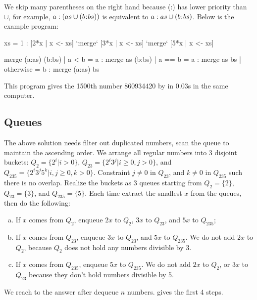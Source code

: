 \documentclass[b5paper]{article}
\begin{document}
We skip many parentheses on the right hand because (:) has lower priority than $\cup$, for example, $a : (as \cup (b \mathbin{\!:\!} bs))$ is equivalent to $a : as \cup (b \mathbin{\!:\!} bs)$. Below is the example program:

\begin{Haskell}
xs = 1 : [2*x | x <- xs] `merge` [3*x | x <- xs] `merge` [5*x | x <- xs]

merge (a:as) (b:bs) | a < b     = a : merge as (b:bs)
                    | a == b    = a : merge as bs
                    | otherwise = b : merge (a:as) bs
\end{Haskell}

This program gives the 1500th number 860934420 by  in 0.03s in the same computer.

\subsection*{Queues}
The above solution needs filter out duplicated numbers, scan the queue to maintain the ascending order. We arrange all regular numbers into 3 disjoint buckets: $Q_2 = \{2^i | i > 0\}$, $Q_{23} = \{ 2^i3^j | i \geq 0, j > 0 \}$, and $Q_{235} = \{ 2^i3^j5^k | i,j \geq 0, k > 0\}$. Constraint $j \neq 0$ in $Q_{23}$, and $k \neq 0$ in $Q_{235}$ such there is no overlap. Realize the buckets as 3 queues starting from $Q_2 = \{ 2 \}$, $Q_{23} = \{ 3\}$, and $Q_{235} = \{ 5 \}$. Each time extract the smallest $x$ from the queues, then do the following:

\begin{enumerate}[(a)]
\item If $x$ comes from $Q_2$, enqueue $2x$ to $Q_2$, $3x$ to $Q_{23}$, and $5x$ to $Q_{235}$;
\item If $x$ comes from $Q_{23}$, enqueue $3x$ to $Q_{23}$, and $5x$ to $Q_{235}$. We do not add $2x$ to $Q_2$, because $Q_2$ does not hold any numbers divisible by 3.
\item If $x$ comes from $Q_{235}$, enqueue $5x$ to $Q_{235}$. We do not add $2x$ to $Q_2$, or $3x$ to $Q_{23}$ because they don't hold numbers divisible by 5.
\end{enumerate}

We reach to the answer after dequeue $n$ numbers.  gives the first 4 steps.
\end{document}
